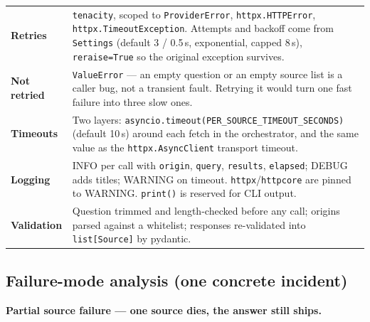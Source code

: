 \documentclass[11pt,a4paper]{article}
\begin{document}
\begin{tabularx}{\textwidth}{@{}lX@{}}
\toprule
\textbf{Retries} & \texttt{tenacity}, scoped to \texttt{ProviderError}, \texttt{httpx.HTTPError},
\texttt{httpx.TimeoutException}. Attempts and backoff come from \texttt{Settings} (default 3 /
0.5\,s, exponential, capped 8\,s), \texttt{reraise=True} so the original exception survives. \\
\addlinespace
\textbf{Not retried} & \texttt{ValueError} --- an empty question or an empty source list is a caller
bug, not a transient fault. Retrying it would turn one fast failure into three slow ones. \\
\addlinespace
\textbf{Timeouts} & Two layers: \texttt{asyncio.timeout(PER\_SOURCE\_TIMEOUT\_SECONDS)} (default
10\,s) around each fetch in the orchestrator, and the same value as the
\texttt{httpx.AsyncClient} transport timeout. \\
\addlinespace
\textbf{Logging} & INFO per call with \texttt{origin}, \texttt{query}, \texttt{results},
\texttt{elapsed}; DEBUG adds titles; WARNING on timeout. \texttt{httpx}/\texttt{httpcore} are pinned
to WARNING. \texttt{print()} is reserved for CLI output. \\
\addlinespace
\textbf{Validation} & Question trimmed and length-checked before any call; origins parsed against a
whitelist; responses re-validated into \texttt{list[Source]} by pydantic. \\
\bottomrule
\end{tabularx}

\subsection{Failure-mode analysis (one concrete incident)}

\textbf{Partial source failure --- one source dies, the answer still ships.}
\end{document}
